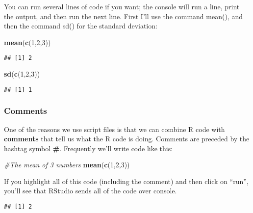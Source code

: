 \documentclass[]{book}
\newenvironment{Shaded}{\begin{snugshade}}{\end{snugshade}}
\newcommand{\KeywordTok}[1]{\textcolor[rgb]{0.13,0.29,0.53}{\textbf{#1}}}
\newcommand{\DecValTok}[1]{\textcolor[rgb]{0.00,0.00,0.81}{#1}}
\newcommand{\CommentTok}[1]{\textcolor[rgb]{0.56,0.35,0.01}{\textit{#1}}}
\newcommand{\NormalTok}[1]{#1}
\theoremstyle{definition}
\theoremstyle{definition}
\theoremstyle{definition}
\theoremstyle{remark}
\begin{document}
You can run several lines of code if you want; the console will run a
line, print the output, and then run the next line. First I'll use the
command mean(), and then the command sd() for the standard deviation:

\begin{Shaded}
\begin{Highlighting}[]
\KeywordTok{mean}\NormalTok{(}\KeywordTok{c}\NormalTok{(}\DecValTok{1}\NormalTok{,}\DecValTok{2}\NormalTok{,}\DecValTok{3}\NormalTok{))}
\end{Highlighting}
\end{Shaded}

\begin{verbatim}
## [1] 2
\end{verbatim}

\begin{Shaded}
\begin{Highlighting}[]
\KeywordTok{sd}\NormalTok{(}\KeywordTok{c}\NormalTok{(}\DecValTok{1}\NormalTok{,}\DecValTok{2}\NormalTok{,}\DecValTok{3}\NormalTok{))}
\end{Highlighting}
\end{Shaded}

\begin{verbatim}
## [1] 1
\end{verbatim}

\subsubsection{Comments}\label{comments}

One of the reasons we use script files is that we can combine R code
with \textbf{comments} that tell us what the R code is doing. Comments
are preceded by the hashtag symbol \textbf{\#}. Frequently we'll write
code like this:

\begin{Shaded}
\begin{Highlighting}[]
\CommentTok{#The mean of 3 numbers}
\KeywordTok{mean}\NormalTok{(}\KeywordTok{c}\NormalTok{(}\DecValTok{1}\NormalTok{,}\DecValTok{2}\NormalTok{,}\DecValTok{3}\NormalTok{))}
\end{Highlighting}
\end{Shaded}

If you highlight all of this code (including the comment) and then click
on ``run'', you'll see that RStudio sends all of the code over console.

\begin{verbatim}
## [1] 2
\end{verbatim}
\end{document}
